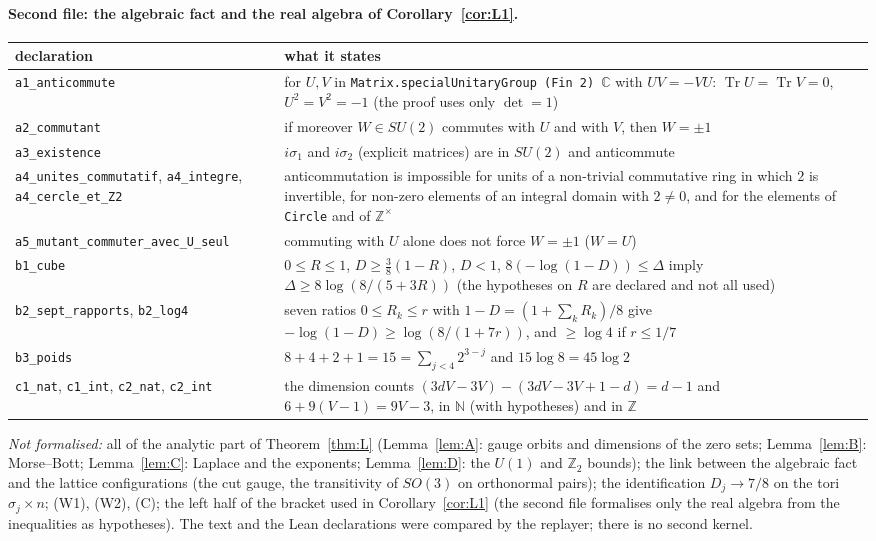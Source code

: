 \documentclass[11pt,a4paper]{article}
\theoremstyle{plain}
\theoremstyle{definition}
\theoremstyle{remark}
\numberwithin{equation}{section}
\newcommand{\Z}{\mathbb{Z}}
\newcommand{\Tr}{\operatorname{Tr}}
\begin{document}
\paragraph{Second file: the algebraic fact and the real algebra of Corollary~\ref{cor:L1}.}
\begin{center}\footnotesize
\begin{tabular}{@{}>{\raggedright\arraybackslash}p{}>{\raggedright\arraybackslash}p{}@{}}
\toprule
declaration & what it states\\
\midrule
\texttt{a1\_anticommute} & for $U,V$ in \texttt{Matrix.specialUnitaryGroup (Fin 2) $\mathbb C$} with $UV=-VU$: $\Tr U=\Tr V=0$, $U^2=V^2=-1$ (the proof uses only $\det=1$)\\
\texttt{a2\_commutant} & if moreover $W\in SU(2)$ commutes with $U$ and with $V$, then $W=\pm1$\\
\texttt{a3\_existence} & $i\sigma_1$ and $i\sigma_2$ (explicit matrices) are in $SU(2)$ and anticommute\\
\texttt{a4\_unites\_\allowbreak commutatif}, \texttt{a4\_integre}, \texttt{a4\_cercle\_\allowbreak et\_Z2} & anticommutation is impossible for units of a non-trivial commutative ring in which $2$ is invertible, for non-zero elements of an integral domain with $2\ne0$, and for the elements of \texttt{Circle} and of $\mathbb Z^\times$\\
\texttt{a5\_mutant\_\allowbreak commuter\_\allowbreak avec\_U\_seul} & commuting with $U$ alone does not force $W=\pm1$ ($W=U$)\\
\texttt{b1\_cube} & $0\le R\le1$, $D\ge\frac38(1-R)$, $D<1$, $8(-\log(1-D))\le\Delta$ imply $\Delta\ge8\log(8/(5+3R))$ (the hypotheses on $R$ are declared and not all used)\\
\texttt{b2\_sept\_rapports}, \texttt{b2\_log4} & seven ratios $0\le R_k\le r$ with $1-D=(1+\sum_kR_k)/8$ give $-\log(1-D)\ge\log(8/(1+7r))$, and $\ge\log4$ if $r\le1/7$\\
\texttt{b3\_poids} & $8+4+2+1=15=\sum_{j<4}2^{3-j}$ and $15\log8=45\log2$\\
\texttt{c1\_nat}, \texttt{c1\_int}, \texttt{c2\_nat}, \texttt{c2\_int} & the dimension counts $(3dV-3V)-(3dV-3V+1-d)=d-1$ and $6+9(V-1)=9V-3$, in $\mathbb N$ (with hypotheses) and in $\mathbb Z$\\
\bottomrule
\end{tabular}
\end{center}
\emph{Not formalised:} all of the analytic part of Theorem~\ref{thm:L} (Lemma~\ref{lem:A}: gauge orbits and dimensions of the zero sets; Lemma~\ref{lem:B}: Morse--Bott; Lemma~\ref{lem:C}: Laplace and the exponents; Lemma~\ref{lem:D}: the $U(1)$ and $\Z_2$ bounds); the link between the algebraic fact and the lattice configurations (the cut gauge, the transitivity of $SO(3)$ on orthonormal pairs); the identification $D_j\to7/8$ on the tori $\sigma_j\times n$; (W1), (W2), (C); the left half of the bracket used in Corollary~\ref{cor:L1} (the second file formalises only the real algebra from the inequalities as hypotheses). The text and the Lean declarations were compared by the replayer; there is no second kernel.
\end{document}
